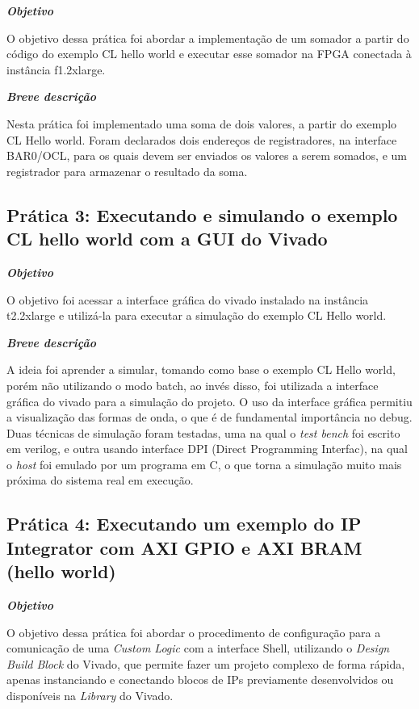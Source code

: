 \noindent\textbf{\textit{Objetivo}}

O objetivo dessa prática foi abordar a implementação de um somador a partir do código do exemplo CL hello world e executar esse somador na FPGA conectada à instância f1.2xlarge.

\noindent\textbf{\textit{Breve descrição}}

Nesta prática foi implementado uma soma de dois valores, a partir do exemplo CL 
Hello world. Foram declarados dois endereços de registradores, na interface BAR0/OCL, para os quais devem ser enviados os valores a serem somados, e um registrador para armazenar o resultado da soma.

\subsection{Prática 3: Executando e simulando o exemplo CL hello world com a GUI do Vivado}

\noindent\textbf{\textit{Objetivo}}

O objetivo foi acessar a interface gráfica do vivado instalado na instância t2.2xlarge e utilizá-la para executar a simulação do exemplo CL Hello world.

\noindent\textbf{\textit{Breve descrição}}

A ideia foi aprender a simular, tomando como base o exemplo CL Hello world, porém não utilizando o modo batch, ao invés disso, foi utilizada a interface gráfica do vivado para a simulação do projeto. O uso da interface gráfica permitiu a visualização das formas de onda, o que é de fundamental importância no debug. Duas técnicas de simulação foram testadas, uma na qual o \textit{test bench} foi escrito em verilog, e outra usando interface DPI (Direct Programming Interfac), na qual o \textit{host} foi emulado por um programa em C, o que torna a simulação muito mais próxima do sistema real em execução.

\subsection{Prática 4: Executando um  exemplo do IP Integrator com AXI GPIO e AXI BRAM (hello world)}

\noindent\textbf{\textit{Objetivo}}

O objetivo dessa prática foi abordar o procedimento de configuração para a comunicação de uma \textit{Custom Logic} com a interface Shell, utilizando o \textit{Design Build Block} do Vivado, que permite fazer um projeto complexo de forma rápida, apenas instanciando e conectando blocos de IPs previamente desenvolvidos ou disponíveis na \textit{Library} do Vivado.


